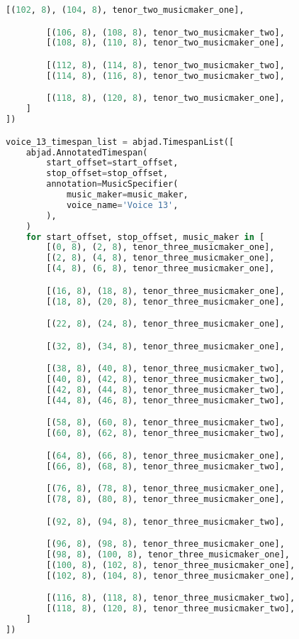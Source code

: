 \begin{lstlisting}[language=Python, caption=Invocation Source Code]
        [(102, 8), (104, 8), tenor_two_musicmaker_one],

        [(106, 8), (108, 8), tenor_two_musicmaker_two],
        [(108, 8), (110, 8), tenor_two_musicmaker_one],

        [(112, 8), (114, 8), tenor_two_musicmaker_two],
        [(114, 8), (116, 8), tenor_two_musicmaker_two],

        [(118, 8), (120, 8), tenor_two_musicmaker_one],
    ]
])

voice_13_timespan_list = abjad.TimespanList([
    abjad.AnnotatedTimespan(
        start_offset=start_offset,
        stop_offset=stop_offset,
        annotation=MusicSpecifier(
            music_maker=music_maker,
            voice_name='Voice 13',
        ),
    )
    for start_offset, stop_offset, music_maker in [
        [(0, 8), (2, 8), tenor_three_musicmaker_one],
        [(2, 8), (4, 8), tenor_three_musicmaker_one],
        [(4, 8), (6, 8), tenor_three_musicmaker_one],

        [(16, 8), (18, 8), tenor_three_musicmaker_one],
        [(18, 8), (20, 8), tenor_three_musicmaker_one],

        [(22, 8), (24, 8), tenor_three_musicmaker_one],

        [(32, 8), (34, 8), tenor_three_musicmaker_one],

        [(38, 8), (40, 8), tenor_three_musicmaker_two],
        [(40, 8), (42, 8), tenor_three_musicmaker_two],
        [(42, 8), (44, 8), tenor_three_musicmaker_two],
        [(44, 8), (46, 8), tenor_three_musicmaker_two],

        [(58, 8), (60, 8), tenor_three_musicmaker_two],
        [(60, 8), (62, 8), tenor_three_musicmaker_two],

        [(64, 8), (66, 8), tenor_three_musicmaker_one],
        [(66, 8), (68, 8), tenor_three_musicmaker_two],

        [(76, 8), (78, 8), tenor_three_musicmaker_one],
        [(78, 8), (80, 8), tenor_three_musicmaker_one],

        [(92, 8), (94, 8), tenor_three_musicmaker_two],

        [(96, 8), (98, 8), tenor_three_musicmaker_one],
        [(98, 8), (100, 8), tenor_three_musicmaker_one],
        [(100, 8), (102, 8), tenor_three_musicmaker_one],
        [(102, 8), (104, 8), tenor_three_musicmaker_one],

        [(116, 8), (118, 8), tenor_three_musicmaker_two],
        [(118, 8), (120, 8), tenor_three_musicmaker_two],
    ]
])


\end{lstlisting}
